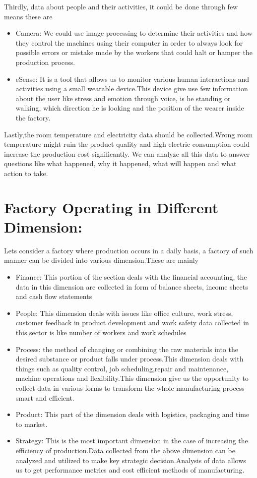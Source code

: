 \documentclass{article}
\begin{document}
\begin{normalsize}
      Thirdly, data about people and their activities, it could be done through few means these are 
       	\begin{itemize}
        
\item{Camera: We could use image processing to determine their activities and how they control the machines using their computer in order to always look for possible errors or mistake made by the workers that could halt or hamper the production process. }
\item{eSense: It is a tool that allows us to monitor various human interactions and activities using a small wearable device.This device give use few information about the user like stress and emotion through voice, is he standing or walking, which direction he is looking and the position of the wearer inside the factory.
} 

	


	\end{itemize}
	Lastly,the room temperature and electricity data should be collected.Wrong room temperature might ruin the product quality and 
high electric consumption could increase the production cost significantly.
	We can analyze all this data to answer questions like what happened, why it happened, what will happen and what action to take.
	\section{Factory Operating in Different Dimension:}
	Lets consider a factory where production occurs in a daily basis, a factory of such manner can be divided into various dimension.These are mainly
	 	\begin{itemize}
        
\item{Finance: This portion of the section deals with the financial accounting, the data in this dimension are collected in form of balance sheets, income sheets and cash flow statements }
\item{People: This dimension deals with issues like office culture, work stress, customer feedback in product development and  work safety data collected in this sector is like number of workers and work schedules} 
\item{Process: the method of changing or combining the raw materials into the desired substance or product falls under process.This dimension deals with things such as quality control, job scheduling,repair and maintenance, machine operations and flexibility.This dimension give us the opportunity to collect data in various forms to transform the whole manufacturing process smart and efficient.}
\item{Product: This part of the dimension deals with logistics, packaging and time to market.
}
\item{Strategy: This is the most important dimension in the case of increasing the efficiency of production.Data collected from the above dimension can be analyzed and utilized  to make key strategic decision.Analysis of data allows us to get performance metrics  and cost efficient methods of manufacturing.
 
}
\end{itemize}
\end{normalsize}
\end{document}
